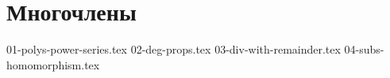 \section{Многочлены}
{01-polys-power-series.tex}
{02-deg-props.tex}
{03-div-with-remainder.tex}
{04-subs-homomorphism.tex}
